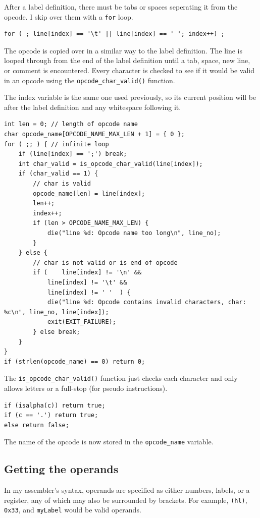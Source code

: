 \documentclass[a4paper]{report}
\begin{document}
After a label definition, there must be tabs or spaces seperating it from the
opcode. I skip over them with a \texttt{for} loop.

\begin{lstlisting}
for ( ; line[index] == '\t' || line[index] == ' '; index++) ;
\end{lstlisting}

The opcode is copied over in a similar way to the label definition. The line
is looped through from the end of the label definition until a tab, space,
new line, or comment is encountered. Every character is checked to see if it
would be valid in an opcode using the \texttt{opcode\_char\_valid()} function.

The index variable is the same one used previously, so its current position will
be after the label definition and any whitespace following it.

\begin{lstlisting}
int len = 0; // length of opcode name
char opcode_name[OPCODE_NAME_MAX_LEN + 1] = { 0 };
for ( ;; ) { // infinite loop
	if (line[index] == ';') break;
	int char_valid = is_opcode_char_valid(line[index]);
	if (char_valid == 1) {
		// char is valid
		opcode_name[len] = line[index];
		len++;
		index++;
		if (len > OPCODE_NAME_MAX_LEN) {
			die("line %d: Opcode name too long\n", line_no);
		}
	} else {
		// char is not valid or is end of opcode
		if (	line[index] != '\n' &&
			line[index] != '\t' &&
			line[index] != ' '	) {
			die("line %d: Opcode contains invalid characters, char: %c\n", line_no, line[index]);
			exit(EXIT_FAILURE);
		} else break;
	}
}
if (strlen(opcode_name) == 0) return 0;
\end{lstlisting}

The \texttt{is\_opcode\_char\_valid()} function just checks each character and
only allows letters or a full-stop (for pseudo instructions).

\begin{lstlisting}
if (isalpha(c)) return true;
if (c == '.') return true;
else return false;
\end{lstlisting}

The name of the opcode is now stored in the \texttt{opcode\_name} variable.

\subsection{Getting the operands}

In my assembler's syntax, operands are specified as either numbers, labels, or
a register, any of which may also be surrounded by brackets. For example,
\texttt{(hl)}, \texttt{0x33}, and \texttt{myLabel} would be valid operands.
\end{document}
